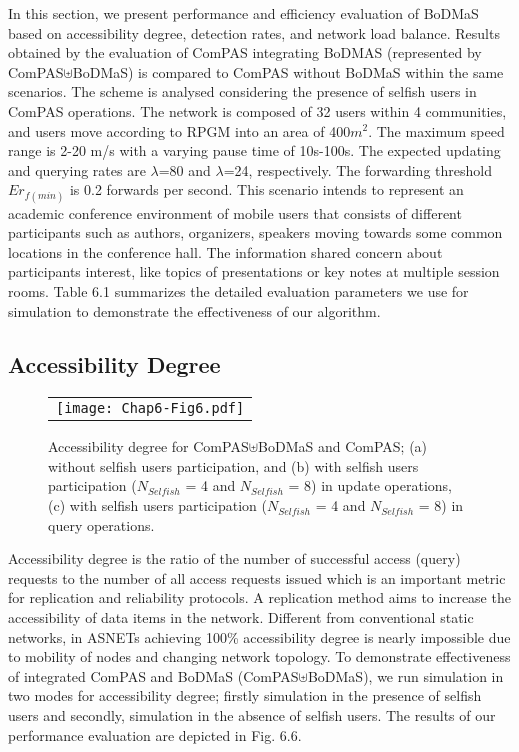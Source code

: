 In this section, we present performance and efficiency evaluation of BoDMaS based on accessibility degree, detection rates, and network load balance. Results obtained by the evaluation of ComPAS integrating BoDMAS (represented by ComPAS$\uplus$BoDMaS) is compared to ComPAS without BoDMaS within the same scenarios. The scheme is analysed considering the presence of selfish users in ComPAS operations. The network is composed of 32 users within 4 communities, and users move according to RPGM into an area of 400$m^2$. The maximum speed range is 2-20 m/s with a varying pause time of 10s-100s. The expected updating and querying rates are $\lambda$=80 and $\lambda$=24, respectively. The forwarding threshold $Er_{f(min)}$ is 0.2 forwards per second. This scenario intends to represent an academic conference environment of mobile users that consists of different participants such as authors, organizers, speakers moving towards some common locations in the conference hall. The information shared concern about participants interest, like topics of presentations or key notes at multiple session rooms. Table 6.1 summarizes the detailed evaluation parameters we use for simulation to demonstrate the effectiveness of our algorithm.

\subsection{Accessibility Degree}\label{Chap6_05_01}
\begin{figure}[t]
\begin{center}
  \begin{tabular}{c}
  \texttt{[image: Chap6-Fig6.pdf]}
  \end{tabular}
  \caption{Accessibility degree for ComPAS$\uplus$BoDMaS and ComPAS; (a) without selfish users participation, and (b) with selfish users participation ($N_{Selfish}$ = 4 and $N_{Selfish}$ = 8) in update operations, (c) with selfish users participation ($N_{Selfish}$ = 4 and $N_{Selfish}$ = 8) in query operations.}
\end{center}
\end{figure}

Accessibility degree is the ratio of the number of successful access (query) requests to the number of all access requests issued which is an important metric for replication and reliability protocols. A replication method aims to increase the accessibility of data items in the network. Different from conventional static networks, in ASNETs achieving 100\% accessibility degree is nearly impossible due to mobility of nodes and changing network topology. To demonstrate effectiveness of integrated ComPAS and BoDMaS (ComPAS$\uplus$BoDMaS), we run simulation in two modes  for accessibility degree; firstly simulation in the presence of selfish users and secondly, simulation in the absence of selfish users. The results of our performance evaluation are depicted in Fig. 6.6.

